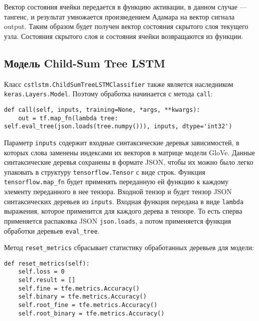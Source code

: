 Вектор состояния ячейки передается в функцию активации, в данном случае --- тангенс, и результат умножается произведением Адамара на вектор сигнала output. Таким образом будет получен вектор состояния скрытого слоя текущего узла. Состояния скрытого слоя и состояния ячейки возвращаются из функции.

\subsection{Модель Child-Sum Tree LSTM}
Класс \texttt{cstlstm.ChildSumTreeLSTMClassifier} также является наследником \texttt{keras.Layers.Model}. Поэтому обработка начинается с метода \texttt{call}:
\medskip
\begin{lstlisting}[style=Python]
  def call(self, inputs, training=None, *args, **kwargs):
    out = tf.map_fn(lambda tree: self.eval_tree(json.loads(tree.numpy())), inputs, dtype='int32')
\end{lstlisting}
\medskip

Параметр \texttt{inputs} содержит входные синтаксические деревья зависимостей, в которых слова заменены индексами их векторов в матрице модели GloVe. Данные синтаксические деревья сохранены в формате JSON, чтобы их можно было легко упаковать в структуру \texttt{tensorflow.Tensor} с виде строк. Функция \texttt{tensorflow.map\_fn} будет применять переданную ей функцию к каждому элементу переданного в нее тензора. Входной тензор и будет тензор JSON синтаксических деревьев из \texttt{inputs}. Входная функция передана в виде \texttt{lambda} выражения, которое применится для каждого дерева в тензоре. То есть сперва применяется распаковка JSON \texttt{json.loads}, а потом применяется функция обработки деревьев \texttt{eval\_tree}.

Метод \texttt{reset\_metrics} сбрасывает статистику обработанных деревьев для модели:
\medskip
\begin{lstlisting}[style=Python]
  def reset_metrics(self):
    self.loss = 0
    self.result = []
    self.fine = tfe.metrics.Accuracy()
    self.binary = tfe.metrics.Accuracy()
    self.root_fine = tfe.metrics.Accuracy()
    self.root_binary = tfe.metrics.Accuracy()
\end{lstlisting}
\medskip

